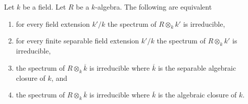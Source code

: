 \begin{lemma}
\label{lemma-geometrically-irreducible}
Let $k$ be a field.
Let $R$ be a $k$-algebra.
The following are equivalent
\begin{enumerate}
\item for every field extension $k'/k$ the
spectrum of $R \otimes_k k'$ is irreducible,
\item for every finite separable field extension $k'/k$ the
spectrum of $R \otimes_k k'$ is irreducible,
\item the spectrum of $R \otimes_k \overline{k}$ is irreducible
where $\overline{k}$ is the separable algebraic closure of $k$, and
\item the spectrum of $R \otimes_k \overline{k}$ is irreducible
where $\overline{k}$ is the algebraic closure of $k$.
\end{enumerate}
\end{lemma}

